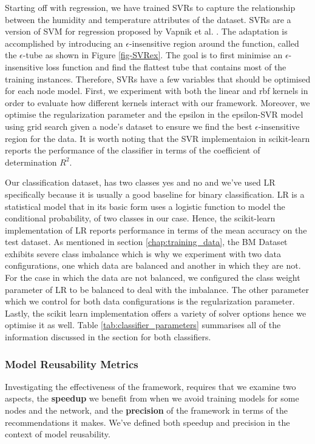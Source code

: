 \documentclass{mpaper}
\begin{document}
Starting off with regression, we have trained SVRs to capture the relationship between the humidity and temperature attributes of the dataset. SVRs are a version of SVM for regression proposed by Vapnik et al. \cite{OriginalSVR}. The adaptation is accomplished by introducing an $\epsilon$-insensitive region around the function, called the $\epsilon$-tube as shown in Figure \ref{fig-SVRex}. The goal is to first minimise an $\epsilon$-insensitive loss function and find the flattest tube that contains most of the training instances. Therefore, SVRs have a few variables that should be optimised for each node model. First, we experiment with both the linear and rbf kernels in order to evaluate how different kernels interact with our framework. Moreover, we optimise the regularization parameter and the epsilon in the epsilon-SVR model using grid search given a node's dataset to ensure we find the best $\epsilon$-insensitive region for the data. It is worth noting that the SVR implementaion in scikit-learn reports the performance of the classifier in terms of the coefficient of determination $R^2$. 

Our classification dataset, has two classes yes and no and we've used LR specifically because it is usually a good baseline for binary classification. LR \cite{OriginalLR} is a statistical model that in its basic form uses a logistic function to model the conditional probability, of two classes in our case. Hence, the scikit-learn implementation of LR reports performance in terms of the mean accuracy on the test dataset. As mentioned in section \ref{chap:training_data}, the BM Dataset exhibits severe class imbalance which is why we experiment with two data configurations, one which data are balanced and another in which they are not. For the case in which the data are not balanced, we configured the class weight parameter of LR to be balanced to deal with the imbalance. The other parameter which we control for both data configurations is the regularization parameter. Lastly, the scikit learn implementation offers a variety of solver options hence we optimise it as well. Table \ref{tab:classifier_parameters} summarises all of the information discussed in the section for both classifiers. 

\subsubsection{Model Reusability Metrics}\label{chap:metrics}

Investigating the effectiveness of the framework, requires that we examine two aspects, the \textbf{speedup} we benefit from when we avoid training models for some nodes and the network, and the \textbf{precision} of the framework in terms of the recommendations it makes. We've defined both speedup and precision in the context of model reusability.
\end{document}
